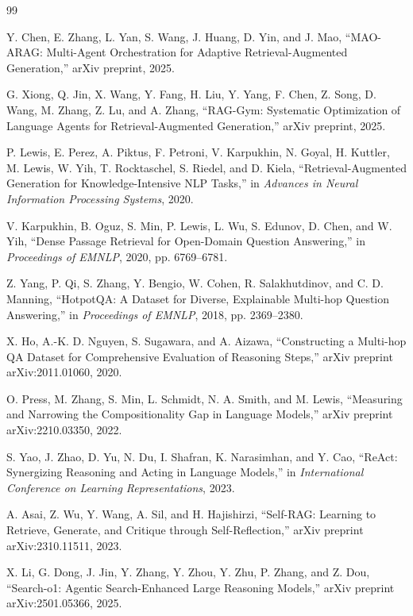 \documentclass[12pt,a4paper]{article}
\begin{document}
\begin{thebibliography}{99}

Y. Chen, E. Zhang, L. Yan, S. Wang, J. Huang, D. Yin, and J. Mao, ``MAO-ARAG: Multi-Agent Orchestration for Adaptive Retrieval-Augmented Generation,'' arXiv preprint, 2025.

G. Xiong, Q. Jin, X. Wang, Y. Fang, H. Liu, Y. Yang, F. Chen, Z. Song, D. Wang, M. Zhang, Z. Lu, and A. Zhang, ``RAG-Gym: Systematic Optimization of Language Agents for Retrieval-Augmented Generation,'' arXiv preprint, 2025.

P. Lewis, E. Perez, A. Piktus, F. Petroni, V. Karpukhin, N. Goyal, H. Kuttler, M. Lewis, W. Yih, T. Rocktaschel, S. Riedel, and D. Kiela, ``Retrieval-Augmented Generation for Knowledge-Intensive NLP Tasks,'' in \textit{Advances in Neural Information Processing Systems}, 2020.

V. Karpukhin, B. Oguz, S. Min, P. Lewis, L. Wu, S. Edunov, D. Chen, and W. Yih, ``Dense Passage Retrieval for Open-Domain Question Answering,'' in \textit{Proceedings of EMNLP}, 2020, pp. 6769--6781.

Z. Yang, P. Qi, S. Zhang, Y. Bengio, W. Cohen, R. Salakhutdinov, and C. D. Manning, ``HotpotQA: A Dataset for Diverse, Explainable Multi-hop Question Answering,'' in \textit{Proceedings of EMNLP}, 2018, pp. 2369--2380.

X. Ho, A.-K. D. Nguyen, S. Sugawara, and A. Aizawa, ``Constructing a Multi-hop QA Dataset for Comprehensive Evaluation of Reasoning Steps,'' arXiv preprint arXiv:2011.01060, 2020.

O. Press, M. Zhang, S. Min, L. Schmidt, N. A. Smith, and M. Lewis, ``Measuring and Narrowing the Compositionality Gap in Language Models,'' arXiv preprint arXiv:2210.03350, 2022.

S. Yao, J. Zhao, D. Yu, N. Du, I. Shafran, K. Narasimhan, and Y. Cao, ``ReAct: Synergizing Reasoning and Acting in Language Models,'' in \textit{International Conference on Learning Representations}, 2023.

A. Asai, Z. Wu, Y. Wang, A. Sil, and H. Hajishirzi, ``Self-RAG: Learning to Retrieve, Generate, and Critique through Self-Reflection,'' arXiv preprint arXiv:2310.11511, 2023.

X. Li, G. Dong, J. Jin, Y. Zhang, Y. Zhou, Y. Zhu, P. Zhang, and Z. Dou, ``Search-o1: Agentic Search-Enhanced Large Reasoning Models,'' arXiv preprint arXiv:2501.05366, 2025.


\end{thebibliography}
\end{document}
